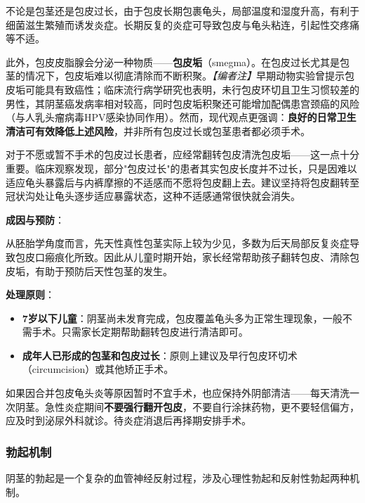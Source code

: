 不论是包茎还是包皮过长，由于包皮长期包裹龟头，局部温度和湿度升高，有利于细菌滋生繁殖而诱发炎症。长期反复的炎症可导致包皮与龟头粘连，引起性交疼痛等不适。

此外，包皮皮脂腺会分泌一种物质——\textbf{包皮垢}（smegma）。在包皮过长尤其是包茎的情况下，包皮垢难以彻底清除而不断积聚。\textit{【编者注】}早期动物实验曾提示包皮垢可能具有致癌性；临床流行病学研究也表明，未行包皮环切且卫生习惯较差的男性，其阴茎癌发病率相对较高，同时包皮垢积聚还可能增加配偶患宫颈癌的风险（与人乳头瘤病毒HPV感染协同作用）。然而，现代观点更强调：\textbf{良好的日常卫生清洁可有效降低上述风险}，并非所有包皮过长或包茎患者都必须手术。

对于不愿或暂不手术的包皮过长患者，应经常翻转包皮清洗包皮垢——这一点十分重要。临床观察发现，部分"包皮过长"的患者其实包皮长度并不过长，只是因难以适应龟头暴露后与内裤摩擦的不适感而不愿将包皮翻上去。建议坚持将包皮翻转至冠状沟处让龟头逐步适应暴露状态，这种不适感通常很快就会消失。

\vspace{0.5em}
\noindent\textbf{成因与预防}：

从胚胎学角度而言，先天性真性包茎实际上较为少见，多数为后天局部反复炎症导致包皮口瘢痕化所致。因此从儿童时期开始，家长经常帮助孩子翻转包皮、清除包皮垢，有助于预防后天性包茎的发生。

\vspace{0.5em}
\noindent\textbf{处理原则}：
\begin{itemize}
	\item \textbf{7岁以下儿童}：阴茎尚未发育完成，包皮覆盖龟头多为正常生理现象，一般不需手术。只需家长定期帮助翻转包皮进行清洁即可。
	\item \textbf{成年人已形成的包茎和包皮过长}：原则上建议及早行包皮环切术（circumcision）或其他矫正手术。
\end{itemize}

\begin{tcolorbox}[colback=pink!5!white,colframe=red!50!black,title=贴心小叮咛]
如果因合并包皮龟头炎等原因暂时不宜手术，也应保持外阴部清洁——每天清洗一次阴茎。急性炎症期间\textbf{不要强行翻开包皮}，不要自行涂抹药物，更不要轻信偏方，应及时到泌尿外科就诊。待炎症消退后再择期安排手术。
\end{tcolorbox}
\subsubsection{勃起机制}

阴茎的勃起是一个复杂的血管神经反射过程，涉及心理性勃起和反射性勃起两种机制。

